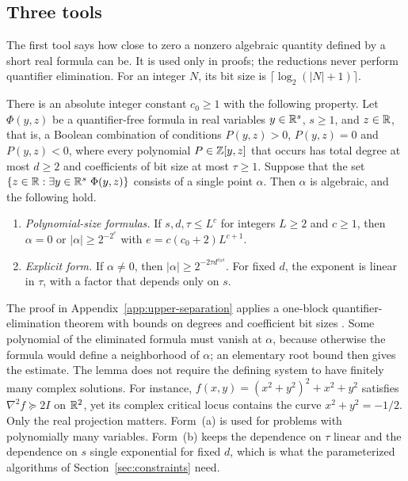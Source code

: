 \subsection{Three tools}
\label{sec:upper-tools}

The first tool says how close to zero a nonzero algebraic quantity defined
by a short real formula can be. It is used only in proofs; the reductions
never perform quantifier elimination. For an integer $N$, its bit size is
$\lceil\log_2(|N|+1)\rceil$.

\begin{lemma}
\label{lem:separation}
There is an absolute integer constant $c_0\ge1$ with the following property.
Let $\Phi(y,z)$ be a quantifier-free formula in real variables $y\in\mathbb R^s$,
$s\ge1$, and $z\in\mathbb R$, that is, a Boolean combination of conditions
$P(y,z)>0$, $P(y,z)=0$ and $P(y,z)<0$, where every polynomial
$P\in\mathbb Z[y,z]$ that occurs has total degree at most $d\ge2$ and coefficients
of bit size at most $\tau\ge1$. Suppose that the set
$\{z\in\mathbb R:\exists y\in\mathbb R^s\ \Phi(y,z)\}$ consists of a single point
$\alpha$. Then $\alpha$ is algebraic, and the following hold.
\begin{enumerate}[label=(\alph*)]
\item \emph{Polynomial-size formulas.} If $s,d,\tau\le L^c$ for integers
$L\ge2$ and $c\ge1$, then $\alpha=0$ or $|\alpha|\ge2^{-2^{e}}$ with
$e=c(c_0+2)L^{c+1}$.
\item \emph{Explicit form.} If $\alpha\ne0$, then
$|\alpha|\ge2^{-2\tau d^{c_0s}}$. For fixed $d$, the exponent is linear in
$\tau$, with a factor that depends only on $s$.
\end{enumerate}
\end{lemma}

The proof in Appendix~\ref{app:upper-separation} applies a one-block
quantifier-elimination theorem with bounds on degrees and coefficient bit
sizes \citep[Theorem~2.27]{Basu2014}. Some polynomial of the eliminated
formula must vanish at $\alpha$, because otherwise the formula would define a
neighborhood of $\alpha$; an elementary root bound then gives the estimate.
The lemma does not require the defining system to have finitely many complex
solutions. For instance, $f(x,y)=(x^2+y^2)^2+x^2+y^2$ satisfies
$\nabla^2f\succeq2I$ on $\mathbb R^2$, yet its complex critical locus contains the
curve $x^2+y^2=-1/2$. Only the real projection matters. Form~(a) is used
for problems with polynomially many variables. Form~(b) keeps the dependence
on $\tau$ linear and the dependence on $s$ single exponential for fixed $d$,
which is what the parameterized algorithms of Section~\ref{sec:constraints}
need.


